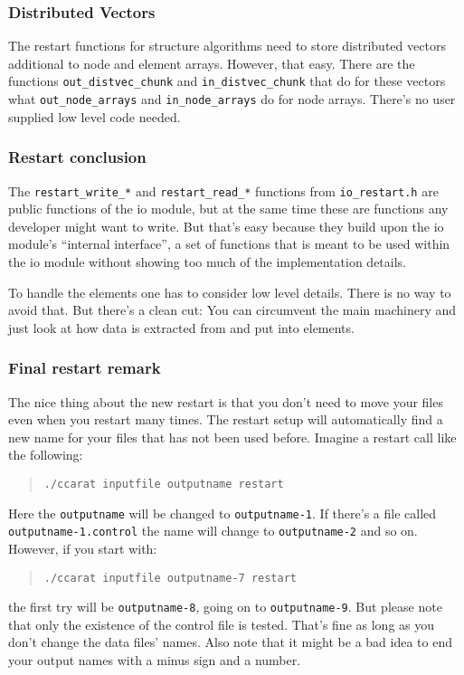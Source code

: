 \subsubsection{Distributed Vectors}

The restart functions for structure algorithms need to store distributed
vectors additional to node and element arrays. However, that easy.
There are the functions \texttt{out{\_}distvec{\_}chunk} and \texttt{in{\_}distvec{\_}chunk}
that do for these vectors what \texttt{out{\_}node{\_}arrays}
and \texttt{in{\_}node{\_}arrays} do for node arrays. There's
no user supplied low level code needed.


\subsubsection{Restart conclusion}

The \texttt{restart{\_}write{\_}{*}} and \texttt{restart{\_}read{\_}{*}}
functions from \texttt{io{\_}restart.h} are public functions of
the io module, but at the same time these are functions any developer
might want to write. But that's easy because they build upon the io
module's {}``internal interface'', a set of functions that is meant
to be used within the io module without showing too much of the implementation
details.

To handle the elements one has to consider low level details. There
is no way to avoid that. But there's a clean cut: You can circumvent
the main machinery and just look at how data is extracted from and
put into elements.


\subsubsection{Final restart remark}

The nice thing about the new restart is that you don't need to move
your files even when you restart many times. The restart setup will
automatically find a new name for your files that has not been used
before. Imagine a restart call like the following: 

\begin{quote}
\texttt{./ccarat~inputfile~outputname~restart }
\end{quote}
Here the \texttt{outputname} will be changed to \texttt{outputname-1}.
If there's a file called \texttt{outputname-1.control} the name will
change to \texttt{outputname-2} and so on. However, if you start with: 

\begin{quote}
\texttt{./ccarat~inputfile~outputname-7~restart }
\end{quote}
the first try will be \texttt{outputname-8}, going on to \texttt{outputname-9}.
But please note that only the existence of the control file is tested.
That's fine as long as you don't change the data files' names. Also
note that it might be a bad idea to end your output names with a minus
sign and a number.


